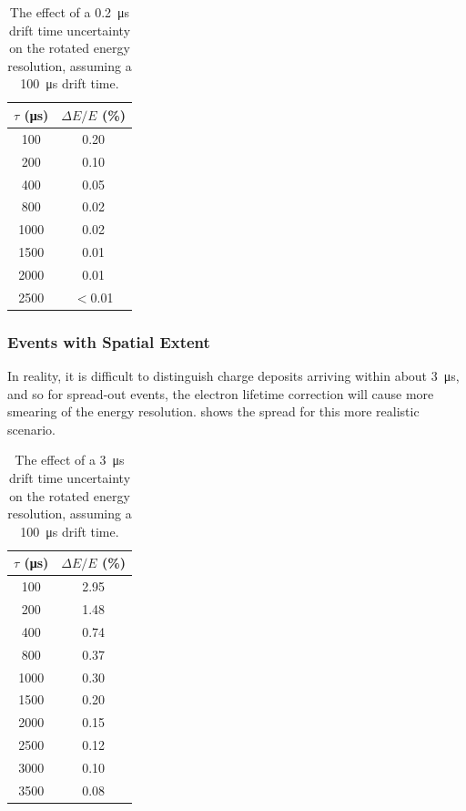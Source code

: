 \documentclass[herrin-thesis.tex]{subfiles}
\begin{document}
\begin{table}[htd]
\centering
\begin{tabular}{c|c}
	\(\tau\) (\si{\micro\second})	&	\(\Delta E / E\) (\%) 	\\ \hline
	100					&	0.20				\\
	200					&	0.10				\\
	400					&	0.05				\\
	800					&	0.02				\\
	1000					&	0.02				\\
	1500					&	0.01				\\
	2000					&	0.01				\\
	2500					&	\(<\)0.01			
\end{tabular}
\caption[Drift time uncertainty effect on resolution]{The effect of a \SI{0.2}{\micro\second} drift time uncertainty on the rotated energy resolution, assuming a \SI{100}{\micro\second} drift time.}
\label{tab:el_res_dt_ideal}
\end{table}

\subsubsection{Events with Spatial Extent}
In reality, it is difficult to distinguish charge deposits arriving within about \SI{3}{\micro\second}, and so for spread-out events, the electron lifetime correction will cause more smearing of the energy resolution.  shows the spread for this more realistic scenario.

\begin{table}[htd]
\centering
\begin{tabular}{c|c}
	\(\tau\) (\si{\micro\second})	&	\(\Delta E / E\) (\%) 	\\ \hline
	100					&	2.95				\\
	200					&	1.48				\\
	400					&	0.74				\\
	800					&	0.37				\\
	1000					&	0.30				\\
	1500					&	0.20				\\
	2000					&	0.15				\\
	2500					&	0.12				\\
	3000					&	0.10				\\
	3500					&	0.08
\end{tabular}
\caption[Drift time uncertainty effect on resolution]{The effect of a \SI{3}{\micro\second} drift time uncertainty on the rotated energy resolution, assuming a \SI{100}{\micro\second} drift time.}
\label{tab:el_res_dt}
\end{table}
\end{document}
